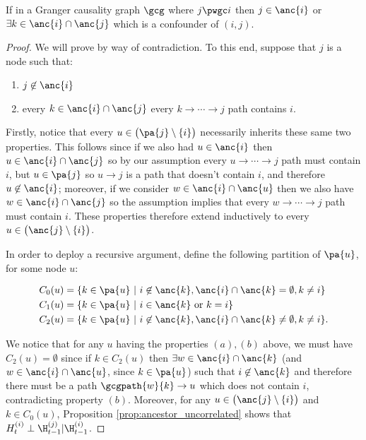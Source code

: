 \begin{proposition}
  \label{prop:ancestor_properties}
  If in a Granger causality graph $\gcg$ where $j \pwgc i$ then
  $j \in \anc{i}$ or $\exists k \in \anc{i} \cap\anc{j}$ which is a
  confounder of $(i, j)$.
\end{proposition}

\begin{proof}
  We will prove by way of contradiction.  To this end, suppose that
  $j$ is a node such that:

  \begin{enumerate}[label=(\alph*)]
    \item{$j \not \in \anc{i}$}
    \item{every $k \in \anc{i} \cap \anc{j}$ every
        $k \rightarrow \cdots \rightarrow j$ path contains $i$.}
  \end{enumerate}

  Firstly, notice that every $u \in \big(\pa{j} \setminus \{i\}\big)$
  necessarily inherits these same two properties.  This follows since
  if we also had $u \in \anc{i}$ then $u \in \anc{i} \cap \anc{j}$ so by our
  assumption every $u \rightarrow \cdots \rightarrow j$ path must contain
  $i$, but $u \in \pa{j}$ so $u \rightarrow j$ is a path that doesn't contain
  $i$, and therefore $u \not\in \anc{i}$; moreover, if we consider
  $w \in \anc{i} \cap \anc{u}$ then we also have
  $w \in \anc{i} \cap \anc{j}$ so the assumption implies that every
  $w \rightarrow \cdots \rightarrow j$ path must contain $i$.  These properties therefore
  extend inductively to every $u \in \big(\anc{j} \setminus \{i\}\big)$.

  In order to deploy a recursive argument, define the following
  partition of $\pa{u}$, for some node $u$:

  \begin{align*}
    C_0(u) &= \{k \in \pa{u}\ |\ i \not\in \anc{k}, \anc{i} \cap \anc{k} = \emptyset, k \ne i\}\\
    C_1(u) &= \{k \in \pa{u}\ |\ i \in \anc{k} \text{ or } k = i\}\\
    C_2(u) &= \{k \in \pa{u}\ |\ i \not\in \anc{k}, \anc{i} \cap \anc{k} \ne \emptyset, k \ne i\}.
  \end{align*}

  We notice that for any $u$ having the properties $(a), (b)$ above,
  we must have $C_2(u) = \emptyset$ since if $k \in C_2(u)$ then
  $\exists w \in \anc{i} \cap \anc{k}$ (and
  $w \in \anc{i} \cap \anc{u}$, since $k \in \pa{u}$) such that
  $i \not \in \anc{k}$ and therefore there must be a path
  $\gcgpath{w}{k} \rightarrow u$ which does not contain $i$,
  contradicting property $(b)$.  Moreover, for any
  $u \in \big(\anc{j} \setminus \{i\}\big)$ and $k \in C_0(u)$,
  Proposition \ref{prop:ancestor_uncorrelated} shows that
  $H_t^{(i)} \perp \H_{t - 1}^{(j)} | \H_{t - 1}^{(i)}$.


\end{proof}

